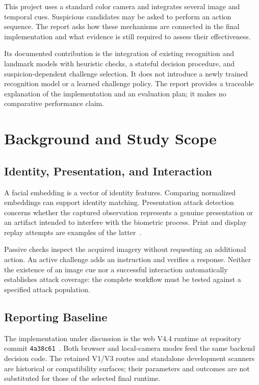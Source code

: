 \documentclass[conference,a4paper]{IEEEtran}
\begin{document}
This project uses a standard color camera and integrates several image and temporal cues. Suspicious candidates may be asked to perform an action sequence. The report asks how these mechanisms are connected in the final implementation and what evidence is still required to assess their effectiveness.

Its documented contribution is the integration of existing recognition and landmark models with heuristic checks, a stateful decision procedure, and suspicion-dependent challenge selection. It does not introduce a newly trained recognition model or a learned challenge policy. The report provides a traceable explanation of the implementation and an evaluation plan; it makes no comparative performance claim.

\section{Background and Study Scope}
\subsection{Identity, Presentation, and Interaction}
A facial embedding is a vector of identity features. Comparing normalized embeddings can support identity matching. Presentation attack detection concerns whether the captured observation represents a genuine presentation or an artifact intended to interfere with the biometric process. Print and display replay attempts are examples of the latter~\cite{padintro,nistpad}.

Passive checks inspect the acquired imagery without requesting an additional action. An active challenge adds an instruction and verifies a response. Neither the existence of an image cue nor a successful interaction automatically establishes attack coverage: the complete workflow must be tested against a specified attack population.

\subsection{Reporting Baseline}
The implementation under discussion is the web V4.4 runtime at repository commit \texttt{4a38c61}~\cite{repository}. Both browser and local-camera modes feed the same backend decision code. The retained V1/V3 routes and standalone development scanners are historical or compatibility surfaces; their parameters and outcomes are not substituted for those of the selected final runtime.
\end{document}
